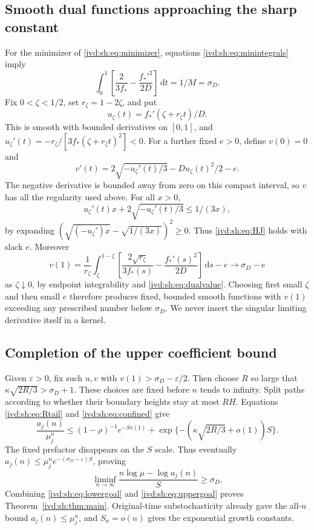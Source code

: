 \documentclass[11pt,letterpaper]{article}
\theoremstyle{remark}\newtheorem{remark}[theorem]{Remark}
\numberwithin{equation}{section}
\newcommand{\dd}{\,\mathrm d}
\begin{document}
\subsection{Smooth dual functions approaching the sharp constant}
For the minimizer of \eqref{ivd:sh:eq:minimizer}, equations
\eqref{ivd:sh:eq:minintegrals} imply
\begin{equation}\label{ivd:sh:eq:dualvalue}
 \int_0^1\left[\frac2{3f_*}-\frac{f_*'^2}{2D}\right]\dd t
 =1/M=\sigma_D.
\end{equation}
Fix $0<\zeta<1/2$, set $r_\zeta=1-2\zeta$, and put
\[
 u_\zeta(t)=f_*'(\zeta+r_\zeta t)/D.
\]
This is smooth with bounded derivatives on $[0,1]$, and
$u_\zeta'(t)=-r_\zeta/[3f_*(\zeta+r_\zeta t)^2]<0$.
For a further fixed $e>0$, define $v(0)=0$ and
\begin{equation}\label{ivd:sh:eq:vdual}
 v'(t)=2\sqrt{-u_\zeta'(t)/3}-Du_\zeta(t)^2/2-e.
\end{equation}
The negative derivative is bounded away from zero on this compact
interval, so $v$ has all the regularity used above. For all $x>0$,
\[
 u_\zeta'(t)x+2\sqrt{-u_\zeta'(t)/3}\le1/(3x),
\]
by expanding
$(\sqrt{(-u_\zeta')x}-\sqrt{1/(3x)})^2\ge0$.
Thus \eqref{ivd:sh:eq:HJ} holds with slack $e$.
Moreover
\begin{equation}\label{ivd:sh:eq:dualapprox}
 v(1)=\frac1{r_\zeta}
 \int_\zeta^{1-\zeta}
 \left[\frac{2\sqrt{r_\zeta}}{3f_*(s)}
                  -\frac{f_*'(s)^2}{2D}\right]\dd s-e
 \longrightarrow\sigma_D-e
\end{equation}
as $\zeta\downarrow0$, by endpoint integrability and
\eqref{ivd:sh:eq:dualvalue}. Choosing first small $\zeta$ and then small
$e$ therefore produces fixed, bounded smooth functions with $v(1)$
exceeding any prescribed number below $\sigma_D$.
We never insert the singular limiting derivative itself in a kernel.

\subsection{Completion of the upper coefficient bound}
Given $\varepsilon>0$, fix such $u,v$ with
$v(1)>\sigma_D-\varepsilon/2$. Then choose $R$ so large that
$\kappa\sqrt{2R/3}>\sigma_D+1$.
These choices are fixed before $n$ tends to infinity.
Split paths according to whether their boundary heights stay at most
$RH$. Equations \eqref{ivd:sh:eq:Rtail} and \eqref{ivd:sh:eq:confined} give
\[
 \frac{a_j(n)}{\mu_j^n}\le
 (1-\rho)^{-1}e^{-Sv(1)}
  +\exp\{-(\kappa\sqrt{2R/3}+o(1))S\}.
\]
The fixed prefactor disappears on the $S$ scale. Thus eventually
$a_j(n)\le\mu_j^n e^{-(\sigma_D-\varepsilon)S}$, proving
\begin{equation}\label{ivd:sh:eq:uppergoal}
 \liminf_{n\to\infty}\frac{n\log\mu-\log a_j(n)}S\ge\sigma_D.
\end{equation}
Combining \eqref{ivd:sh:eq:lowergoal} and \eqref{ivd:sh:eq:uppergoal} proves
Theorem~\ref{ivd:sh:thm:main}. Original-time substochasticity already gave
the all-$n$ bound $a_j(n)\le\mu_j^n$, and $S_n=o(n)$ gives the
exponential growth constants.
\end{document}
